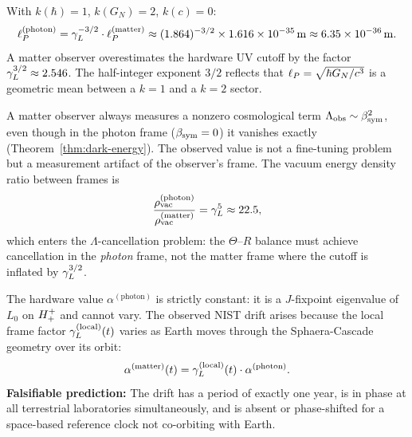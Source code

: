 \begin{theorem}\label{thm:planck-photon}
With $k(\hbar)=1$, $k(G_N)=2$, $k(c)=0$:
\[
 \ell_P^{(\mathrm{photon})}
 = \gamma_L^{-3/2}\cdot\ell_P^{(\mathrm{matter})}
 \approx (1.864)^{-3/2}\times 1.616\times10^{-35}\,\mathrm{m}
 \approx 6.35\times10^{-36}\,\mathrm{m}.
\]
A matter observer overestimates the hardware UV cutoff by the factor
$\gamma_L^{3/2}\approx 2.546$.
The half-integer exponent $3/2$ reflects that $\ell_P=\sqrt{\hbar G_N/c^3}$
is a geometric mean between a $k=1$ and a $k=2$ sector.
\end{theorem}


\begin{corollary}
A matter observer always measures a nonzero cosmological term
$\Lambda_{\mathrm{obs}}\sim\beta_{\mathrm{sym}}^2$, even though in the photon frame
($\beta_{\mathrm{sym}}=0$) it vanishes exactly
(Theorem~\ref{thm:dark-energy}).
The observed value is not a fine-tuning problem but a measurement
artifact of the observer's frame.
The vacuum energy density ratio between frames is
\[
 \frac{\rho_{\mathrm{vac}}^{(\mathrm{photon})}}
 {\rho_{\mathrm{vac}}^{(\mathrm{matter})}}
 = \gamma_L^5\approx 22.5,
\]
which enters the $\Lambda$-cancellation problem: the $\Theta$--$R$
balance must achieve cancellation in the \emph{photon} frame, not the
matter frame where the cutoff is inflated by $\gamma_L^{3/2}$.
\end{corollary}


\begin{corollary}
The hardware value $\alpha^{(\mathrm{photon})}$ is strictly constant:
it is a $J$-fixpoint eigenvalue of $L_0$ on $H^+_+$ and cannot vary.
The observed NIST drift arises because the local frame factor
$\gamma_L^{(\mathrm{local})}(t)$ varies as Earth moves through the
Sphaera-Cascade geometry over its orbit:
\[
 \alpha^{(\mathrm{matter})}(t)
 = \gamma_L^{(\mathrm{local})}(t)\cdot\alpha^{(\mathrm{photon})}.
\]
\textbf{Falsifiable prediction:} The drift has a period of exactly one
year, is in phase at all terrestrial laboratories simultaneously, and is
absent or phase-shifted for a space-based reference clock not co-orbiting
with Earth.
\end{corollary}

